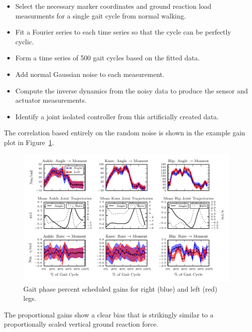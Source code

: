 \documentclass{article}
\begin{document}
\begin{itemize}
  \item Select the necessary marker coordinates and ground reaction load
    measurments for a single gait cycle from normal walking.
  \item Fit a Fourier series to each time series so that the cycle can be
    perfectly cyclic.
  \item Form a time series of 500 gait cycles based on the fitted data.
  \item Add normal Gaussian noise to each measurement.
  \item Compute the inverse dynamics from the noisy data to produce the sensor
    and actuator measurements.
  \item Identify a joint isolated controller from this artificially created
    data.
\end{itemize}

The correlation based entirely on the random noise is shown in the example gain
plot in Figure~\ref{fig:inverse-dynamics=correlation-gains}.
%
\begin{figure}
  \begin{center}
    \includegraphics{figures/example-inverse-dynamics-correlation-gains.pdf}
    \caption{Gait phase percent scheduled gains for right (blue) and left (red) legs.}
    \label{fig:inverse-dynamics=correlation-gains}
  \end{center}
\end{figure}

The proportional gains show a clear bias that is strikingly similar to a
proportionally scaled vertical ground reaction force.
\end{document}
